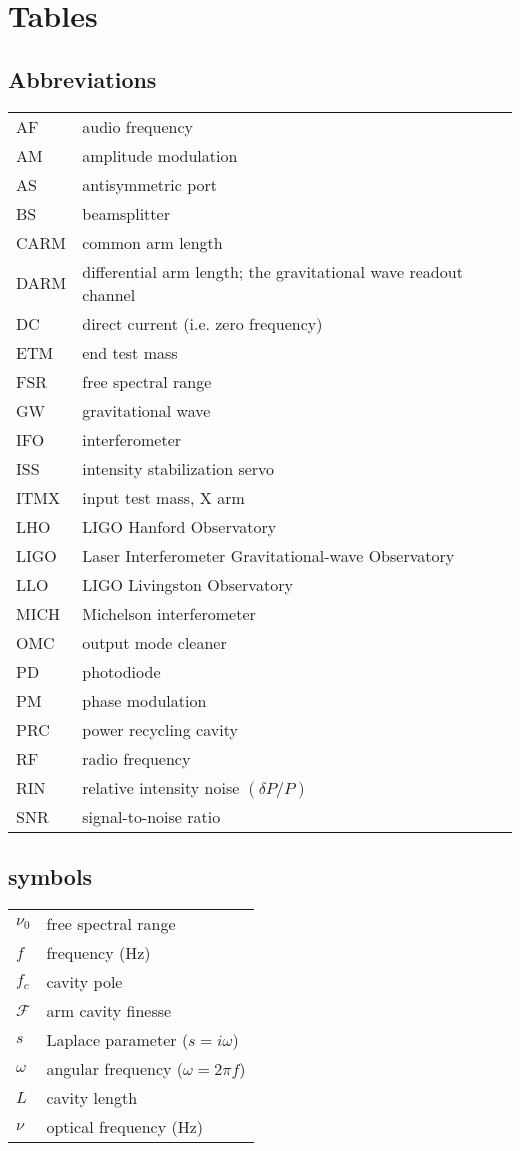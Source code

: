 \chapter{Tables}
\label{chapter6}
\section{Abbreviations}
\singlespacing
\begin{tabular}{|l|l|}
\hline 
AF   & audio frequency \\
AM   & amplitude modulation \\
AS   & antisymmetric port \\
BS   & beamsplitter \\
CARM & common arm length \\
DARM & differential arm length; the gravitational wave readout channel \\
DC   & direct current (i.e. zero frequency) \\
ETM  & end test mass \\
FSR  & free spectral range \\
GW   & gravitational wave \\
IFO  & interferometer \\
ISS  & intensity stabilization servo \\
ITMX & input test mass, X arm \\
LHO  & LIGO Hanford Observatory \\
LIGO & Laser Interferometer Gravitational-wave Observatory \\
LLO  & LIGO Livingston Observatory \\
MICH & Michelson interferometer \\
OMC  & output mode cleaner \\
PD   & photodiode \\
PM   & phase modulation \\
PRC  & power recycling cavity \\
RF   & radio frequency \\
RIN  & relative intensity noise $(\delta P/P)$ \\
SNR  & signal-to-noise ratio \\
\hline
\end{tabular}

\section{symbols}

\begin{tabular}{|l|l|}
\hline
$\nu_0$         & free spectral range \\
$f$             & frequency (Hz) \\
$f_c$           & cavity pole \\
$\mathcal{F}$   & arm cavity finesse \\
$s$             & Laplace parameter ($s=i\omega$) \\
$\omega$        & angular frequency ($\omega=2\pi f$) \\
$L$             & cavity length \\
$\nu$           & optical frequency (Hz) \\
\hline
\end{tabular}
